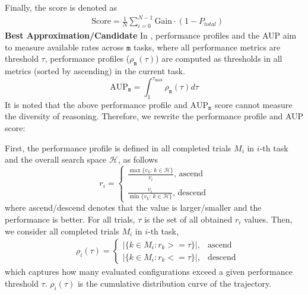 Finally, the score is denoted as
\begin{align}
    & \text{Score} = \frac{1}{N}\sum^{N-1}_{i=0} \text{Gain} \cdot (1-P_{total})
\end{align}
\noindent \textbf{Best Approximation/Candidate} In \cite{MLgym}, performance profiles and the AUP aim to measure available rates across $\texttt{m}$ tasks, where all performance metrics are threshold $\tau$, performance profiles ($ \rho_\texttt{m}(\tau)$) are computed as thresholds in all metrics (sorted by ascending) in the current task.
\begin{equation}
    \text{AUP}_\texttt{m} = \int^{\tau_{\max}}_1 \rho_\texttt{m}(\tau) d\tau
\end{equation}
It is noted that the above performance profile and $\text{AUP}_\texttt{m}$ score cannot measure the diversity of reasoning. Therefore, we rewrite the performance profile and AUP score:

First, the performance profile is defined in all completed trials $M_i$ in $i$-th task and the overall search space $\mathcal{H}$, as follows 
\begin{equation}
    r_i =
    \begin{cases}
         \frac{\max{\{v_k:\, k \in \mathcal{H}\}}}{v_i},\, \text{ascend}  
         \\
         \\
         \frac{v_i}{\min{\{v_k:\, k \in \mathcal{H}\}}},\, \text{descend}
    \end{cases}
\end{equation}
where ascend/descend denotes that the value is larger/smaller and the performance is better. For all trials, $\tau$ is the set of all obtained $r_i$ values. Then, we consider all completed trials $M_i$ in $i$-th task, 
\begin{align}
    & \rho_i(\tau) = \begin{cases}
         |\{k \in M_i: r_k >= \tau \}|, &\text{ascend} \\
        |\{k \in M_i: r_k <= \tau \}|, & \text{descend}
    \end{cases}
\end{align}
which captures how many evaluated configurations exceed a given performance threshold $\tau$. $\rho_i(\tau)$ is the cumulative distribution curve of the trajectory. 

